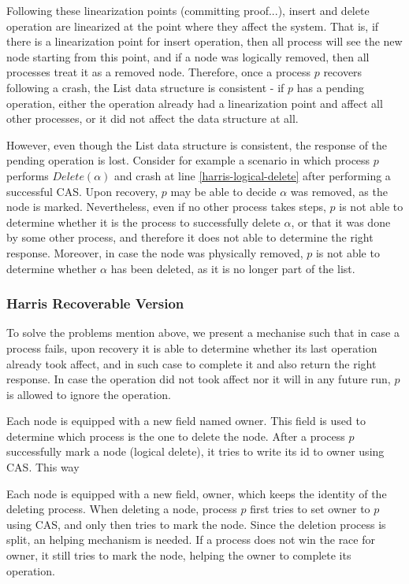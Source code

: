 Following these linearization points (committing proof...), insert and delete operation are linearized at the point where they affect the system. That is, if there is a linearization point for insert operation, then all process will see the new node starting from this point, and if a node was logically removed, then all processes treat it as a removed node. Therefore, once a process $p$ recovers following a crash, the List data structure is consistent - if $p$ has a pending operation, either the operation already had a linearization point and affect all other processes, or it did not affect the data structure at all.

However, even though the List data structure is consistent, the response of the pending operation is lost. Consider for example a scenario in which process $p$ performs $Delete(\alpha)$ and crash at line \ref{harris-logical-delete} after performing a successful CAS. Upon recovery, $p$ may be able to decide $\alpha$ was removed, as the node is marked. Nevertheless, even if no other process takes steps, $p$ is not able to determine whether it is the process to successfully delete $\alpha$, or that it was done by some other process, and therefore it does not able to determine the right response. Moreover, in case the node was physically removed, $p$ is not able to determine whether $\alpha$ has been deleted, as it is no longer part of the list.


\subsubsection{Harris Recoverable Version}

To solve the problems mention above, we present a mechanise such that in case a process fails, upon recovery it is able to determine whether its last operation already took affect, and in such case to complete it and also return the right response. In case the operation did not took affect nor it will in any future run, $p$ is allowed to ignore the operation.

Each node is equipped with a new field named owner. This field is used to determine which process is the one to delete the node. After a process $p$ successfully mark a node (logical delete), it tries to write its id to owner using CAS. This way



Each node is equipped with a new field, owner, which keeps the identity of the deleting process. When deleting a node, process $p$ first tries to set owner to $p$ using CAS, and only then tries to mark the node. Since the deletion process is split, an helping mechanism is needed. If a process does not win the race for owner, it still tries to mark the node, helping the owner to complete its operation.

